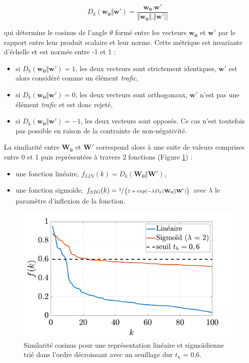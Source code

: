 \begin{equation}\label{eq:similarite_cosinus}
 D_{k}(\mathbf{w_0}\Vert\mathbf{w'}) = \frac{\mathbf{w_0}.\mathbf{w'}}{\Vert\mathbf{w_0}  \Vert. \Vert\mathbf{w'} \vert \vert}
\end{equation}

qui détermine le cosinus de l'angle $\theta$ formé entre les vecteurs $\mathbf{w_0}$ et $\mathbf{w'}$ par le rapport entre leur produit scalaire et leur norme. Cette métrique est invariante d'échelle et est normée entre -1 et 1 :

\begin{itemize}
\item si $D_{k}(\mathbf{w_0}\Vert\mathbf{w'}) = 1$, les deux vecteurs sont strictement identiques, $\mathbf{w'}$ est alors considéré comme un élément \textit{trafic},
\item si $D_{k}(\mathbf{w_0}\Vert\mathbf{w'}) = 0$, les deux vecteurs sont orthogonaux, $\mathbf{w'}$ n'est pas une élément \textit{trafic} et est donc rejeté,
\item si $D_{k}(\mathbf{w_0}\Vert\mathbf{w'}) = -1$, les deux vecteurs sont opposés. Ce cas n'est toutefois pas possible en raison de la contrainte de non-négativité.\\
\end{itemize}

La similarité entre $\mathbf{W_0}$ et $\mathbf{W'}$ correspond alors à une suite de valeurs comprises entre 0 et 1 puis représentées à travers 2 fonctions (Figure \ref{fig:resume_simil}) :

\begin{itemize}
\item une fonction linéaire, $f_{LIN}(k) = D_{k}(\mathbf{W_0} \Vert \mathbf{W'})$,
\item une fonction sigmoïde, $f_{SIG}(k) = \sfrac{1}{\left(1+\exp({-\lambda D_{k}(\mathbf{W_0} \Vert \mathbf{W'})}\right)}$ avec $\lambda$ le paramètre d'inflexion de la fonction.\\
\end{itemize}

\begin{figure}
    \centering
    \includegraphics[width=0.7\linewidth]{./figures/NMF/lin_sig.pdf}
    \caption{Similarité cosinus pour une représentation linéaire et sigmoïdienne trié dans l'ordre décroissant avec un seuillage dur $t_h$ = 0,6.}
    \label{fig:resume_simil}
\end{figure}

